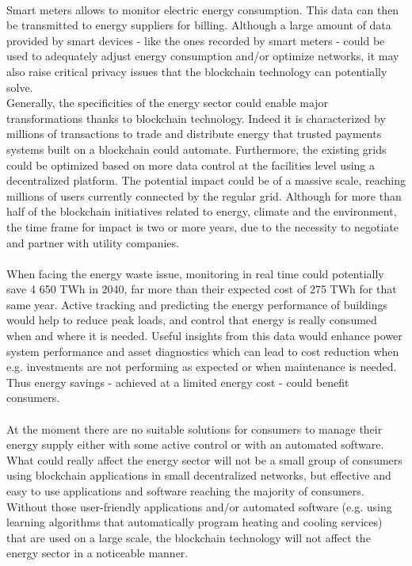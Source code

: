 \documentclass[11pt]{article}
\begin{document}
\\
Smart meters allows to monitor electric energy consumption. This data can then be transmitted to energy suppliers for billing. Although a large amount of data provided by smart devices - like the ones recorded by smart meters - could be used to adequately adjust energy consumption and/or optimize networks, it may also raise critical privacy issues \cite{4} that the blockchain technology can potentially solve.\\
Generally, the specificities of the energy sector could enable major transformations thanks to blockchain technology. Indeed it is characterized by millions of transactions to trade and distribute energy that trusted payments systems built on a blockchain could automate. Furthermore, the existing grids could be optimized based on more data control at the facilities level using a decentralized platform. The potential impact could be of a massive scale, reaching millions of users currently connected by the regular grid. Although for more than half of the blockchain initiatives related to energy, climate and the environment, the time frame for impact is two or more years, due to the necessity to negotiate and partner with utility companies.\cite{5}\\\\
When facing the energy waste issue, monitoring in real time could potentially save 4 650 TWh in 2040, far more than their expected cost of 275 TWh for that same year. Active tracking and predicting the energy performance of buildings would help to reduce peak loads, and control that energy is really consumed when and where it is needed. Useful insights from this data would enhance power system performance and asset diagnostics which can lead to cost reduction when e.g. investments are not performing as expected or when maintenance is needed. Thus energy savings - achieved at a limited energy cost - could benefit consumers.\cite{6}\\\\
At the moment there are no suitable solutions for consumers to manage their energy supply either with some active control or with an automated software. What could really affect the energy sector will not be a small group of consumers using blockchain applications in small decentralized networks, but effective and easy to use applications and software reaching the majority of consumers. Without those user-friendly applications and/or automated software (e.g. using learning algorithms that automatically program heating and cooling services) that are used on a large scale, the blockchain technology will not affect the energy sector in a noticeable manner.\cite{7}\\\\
\end{document}
